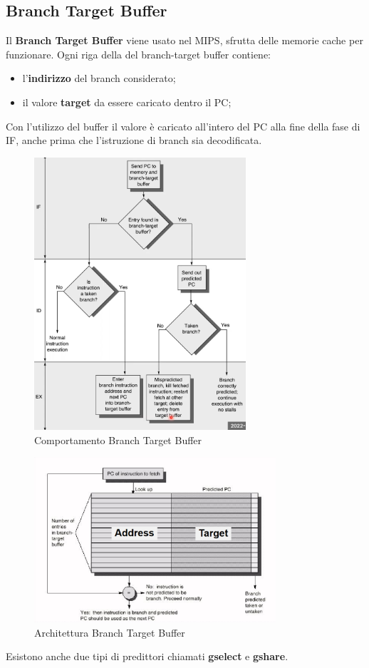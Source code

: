 \documentclass[12pt]{article}
\begin{document}
\subsection{Branch Target Buffer}
Il \textbf{Branch Target Buffer} viene usato nel MIPS, sfrutta delle memorie cache per funzionare. Ogni riga della del branch-target buffer contiene:
\begin{itemize}
    \item l'\textbf{indirizzo} del branch considerato;
    \item il valore \textbf{target} da essere caricato dentro il PC;
\end{itemize}
Con l'utilizzo del buffer il valore \`e caricato all'intero del PC alla fine della fase di IF, anche prima che l'istruzione di branch sia decodificata.
\begin{figure}[H]
    \centering
    \includegraphics[width=0.7\textwidth]{comportamento-branch-target-buffer.png}
    \caption{Comportamento Branch Target Buffer}
    \label{fig:comportamento-branch-target-buffer}
\end{figure}
\begin{figure}[H]
    \centering
    \includegraphics[width=0.8\textwidth]{architetture-branch-target-buffer.png}
    \caption{Architettura Branch Target Buffer}
    \label{fig:architetture-branch-target-buffer}
\end{figure}
Esistono anche due tipi di predittori chiamati \textbf{gselect} e \textbf{gshare}.
\end{document}
